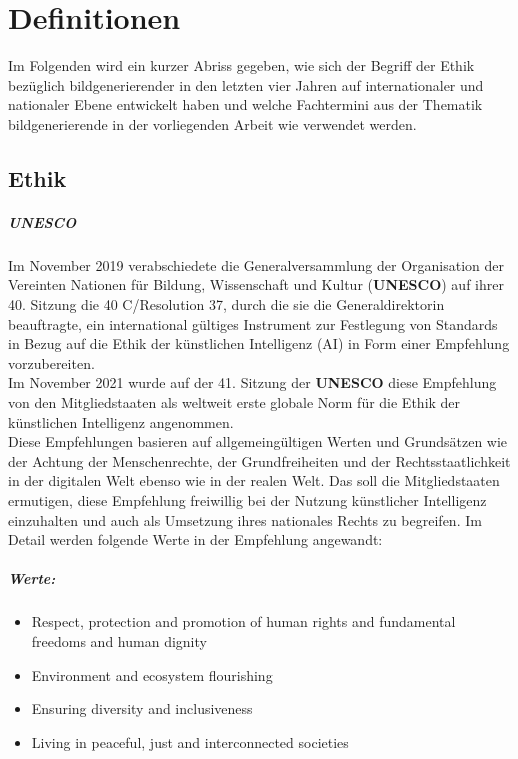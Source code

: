\documentclass[12pt]{report}
\begin{document}

\chapter{Definitionen}
Im Folgenden wird ein kurzer Abriss gegeben, wie sich der Begriff der Ethik bezüglich bildgenerierender  in den letzten vier Jahren auf internationaler und nationaler Ebene entwickelt haben und welche Fachtermini aus der Thematik bildgenerierende  in der vorliegenden Arbeit wie verwendet werden.
\section{Ethik}\label{def_ai}

\paragraph{UNESCO\cite{UNESCO}\\}
Im November 2019 verabschiedete die Generalversammlung der Organisation der Vereinten Nationen für Bildung, Wissenschaft und Kultur (\textbf{UNESCO}) auf ihrer 40. Sitzung die 40 C/Resolution 37, durch die sie die Generaldirektorin beauftragte, \glqq ein international gültiges Instrument zur Festlegung von Standards in Bezug auf die Ethik der künstlichen Intelligenz (AI) in Form einer Empfehlung vorzubereiten\glqq{}.\\Im November 2021 wurde auf der 41. Sitzung der \textbf{UNESCO} diese Empfehlung von den Mitgliedstaaten als weltweit erste globale Norm für die Ethik der künstlichen Intelligenz angenommen.\\

Diese Empfehlungen basieren auf allgemeingültigen Werten und Grundsätzen wie der Achtung der Menschenrechte, der Grundfreiheiten und der Rechtsstaatlichkeit in der digitalen Welt ebenso wie in der realen Welt. Das soll die Mitgliedstaaten ermutigen, diese Empfehlung freiwillig bei der Nutzung künstlicher Intelligenz einzuhalten und auch als Umsetzung ihres nationales Rechts zu begreifen. Im Detail werden folgende Werte in der Empfehlung angewandt:

\paragraph{Werte:}
\begin{itemize}
	\item Respect, protection and promotion of human rights and fundamental freedoms and human dignity
	\item Environment and ecosystem flourishing
	\item Ensuring diversity and inclusiveness
	\item Living in peaceful, just and interconnected societies
\end{itemize}
\end{document}
